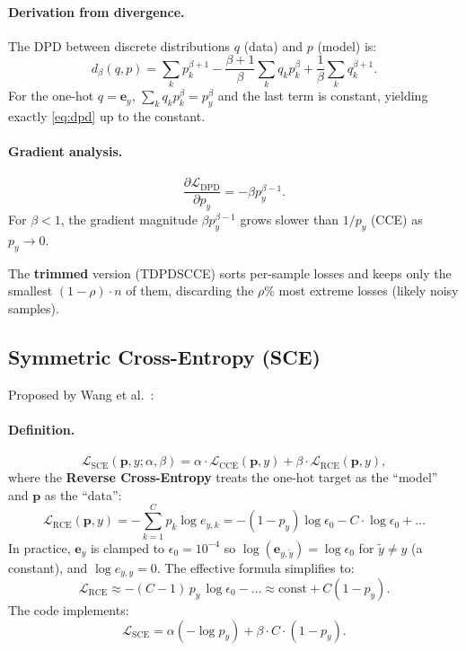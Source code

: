 \documentclass[11pt,a4paper]{article}
\newcommand{\Lcal}{\mathcal{L}}
\newcommand{\py}{p_y}
\newcommand{\pb}{\mathbf{p}}
\newcommand{\eb}{\mathbf{e}}
\begin{document}
\paragraph{Derivation from divergence.}
The DPD between discrete distributions $q$ (data) and $p$ (model) is:
\[
  d_\beta(q, p) = \sum_k p_k^{\beta+1} - \frac{\beta+1}{\beta}\sum_k q_k p_k^\beta + \frac{1}{\beta}\sum_k q_k^{\beta+1}.
\]
For the one-hot $q = \eb_y$, $\sum_k q_k p_k^\beta = p_y^\beta$ and the last term is constant,
yielding exactly \cref{eq:dpd} up to the constant.

\paragraph{Gradient analysis.}
\[
  \frac{\partial \Lcal_{\mathrm{DPD}}}{\partial \py} = -\beta \py^{\beta - 1}.
\]
For $\beta < 1$, the gradient magnitude $\beta \py^{\beta-1}$ grows slower than $1/\py$ (CCE)
as $\py \to 0$.

The \textbf{trimmed} version (TDPDSCCE) sorts per-sample losses and keeps only the smallest
$(1-\rho)\cdot n$ of them, discarding the $\rho\%$ most extreme losses (likely noisy samples).

\subsection{Symmetric Cross-Entropy (SCE)}
\label{sec:sce}

Proposed by Wang et al.\ \cite{wang2019sce}:

\paragraph{Definition.}
\begin{equation}
  \label{eq:sce}
  \Lcal_{\mathrm{SCE}}(\pb, y; \alpha, \beta) = \alpha \cdot \Lcal_{\mathrm{CCE}}(\pb, y)
  + \beta \cdot \Lcal_{\mathrm{RCE}}(\pb, y),
\end{equation}
where the \textbf{Reverse Cross-Entropy} treats the one-hot target as the ``model''
and $\pb$ as the ``data'':
\[
  \Lcal_{\mathrm{RCE}}(\pb, y) = -\sum_{k=1}^C p_k \log e_{y,k}
  = -(1-\py)\log\epsilon_0 - C\cdot\log\epsilon_0 + \ldots
\]
In practice, $\eb_y$ is clamped to $\epsilon_0 = 10^{-4}$ so $\log(\eb_{y,\tilde y}) = \log\epsilon_0$
for $\tilde y \neq y$ (a constant), and $\log e_{y,y} = 0$. The effective formula simplifies to:
\[
  \Lcal_{\mathrm{RCE}} \approx -(C-1)\,\py\,\log\epsilon_0 - \ldots \approx \text{const} + C(1-\py).
\]
The code implements:
\begin{equation}
  \Lcal_{\mathrm{SCE}} = \alpha(-\log \py) + \beta \cdot C \cdot (1-\py).
\end{equation}
\end{document}
